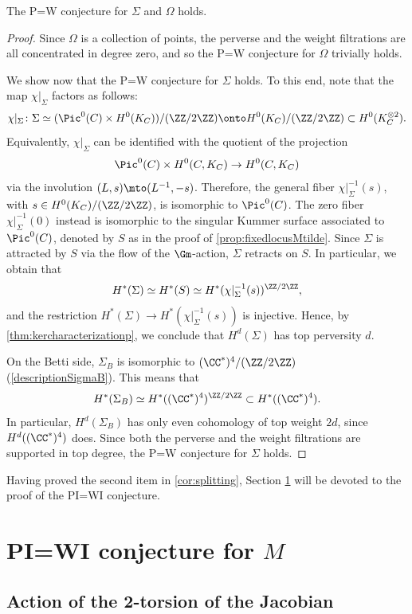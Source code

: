 \begin{thm}[P=W for singular loci] \label{P=Wforsingularloci}
The P=W conjecture for $\Sigma$ and $\Omega$ holds.
\end{thm}
\begin{proof}
Since $\Omega$ is a collection of points, the perverse and the weight filtrations are all concentrated in degree zero, and so the P=W conjecture for $\Omega$ trivially holds.

We show now that the P=W conjecture for $\Sigma$ holds. To this end, note that the map $\chi|_{\Sigma}$ factors as follows:
\[
\chi|_{\Sigma}\colon \Sigma \simeq (\Pic^0(C) \times H^0(K_C))/(\ZZ/2\ZZ) \onto H^0(K_C)/(\ZZ/2\ZZ) \subset H^0(K_C^{\otimes 2}).
\]
Equivalently, $\chi|_{\Sigma}$ can be identified with the quotient of the projection
\[
\Pic^0(C) \times H^0(C, K_C) \to H^0(C, K_C)
\]
via the involution $(L, s) \mto (L^{-1}, -s)$. Therefore, the general fiber $\chi|_{\Sigma}^{-1}(s)$, with $s \in H^0(K_C)/(\ZZ/2\ZZ)$, is isomorphic to $\Pic^0(C)$. The zero fiber $\chi|_{\Sigma}^{-1}(0)$ instead is isomorphic to the singular Kummer surface associated to $\Pic^0(C)$, denoted by $S$ as in the proof of \cref{prop:fixedlocusMtilde}. Since $\Sigma$ is attracted by $S$ via the flow of the $\Gm$\nobreakdash-action, $\Sigma$ retracts on $S$. In particular, we obtain that
\[
H^*(\Sigma)\simeq H^*(S) \simeq H^*(\chi|_{\Sigma}^{-1}(s))^{\ZZ/2\ZZ},
\]
and the restriction $H^*(\Sigma) \to H^*(\chi|_{\Sigma}^{-1}(s))$ is injective. Hence, by \cref{thm:kercharacterizationp}, we conclude that $H^d(\Sigma)$ has top perversity $d$.

On the Betti side, $\Sigma_B$ is isomorphic to $(\CC^*)^{4}/(\ZZ/2\ZZ)$ (\cf \eqref{descriptionSigmaB}). This means that
\[
H^*(\Sigma_B) \simeq H^*((\CC^*)^{4})^{\ZZ/2\ZZ} \subset H^*((\CC^*)^{4}).
\]
In particular, $H^{d}(\Sigma_B)$ has only even cohomology of top weight $2d$, since $H^d((\CC^*)^{4})$ does. Since both the perverse and the weight filtrations are supported in top degree, the P=W conjecture for $\Sigma$ holds.
\end{proof}

Having proved the second item in \cref{cor:splitting},
Section \ref{sec:PI=WI} will be devoted to the proof of the PI=WI conjecture.

\section{PI=WI conjecture for \texorpdfstring{$M$}{M}}\label{sec:PI=WI}
\subsection{Action of the 2-torsion of the Jacobian}\label{sec:The action of the 2-torsion of the Jacobian}

